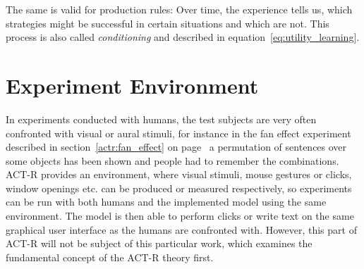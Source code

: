 The same is valid for production rules: Over time, the experience tells us, which strategies might be successful in certain situations and which are not. This process is also called \emph{conditioning} and described in equation~\eqref{eq:utility_learning}.

\section{Experiment Environment}
\label{experiment_environment}

In experiments conducted with humans, the test subjects are very often confronted with visual or aural stimuli, for instance in the fan effect experiment described in section~\ref{actr:fan_effect} on page~\pageref{actr:fan_effect} a permutation of sentences over some objects has been shown and people had to remember the combinations. ACT-R provides an environment, where visual stimuli, mouse gestures or clicks, window openings etc. can be produced or measured respectively, so experiments can be run with both humans and the implemented model using the same environment. The model is then able to perform clicks or write text on the same graphical user interface as the humans are confronted with. However, this part of ACT-R will not be subject of this particular work, which examines the fundamental concept of the ACT-R theory first.
